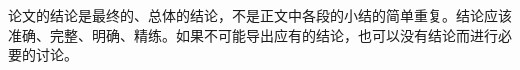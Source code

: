 \begin{conclusion}
\label{cha:conclusion}


论文的结论是最终的、总体的结论，不是正文中各段的小结的简单重复。结论应该准确、完整、明确、精练。如果不可能导出应有的结论，也可以没有结论而进行必要的讨论。



\end{conclusion}